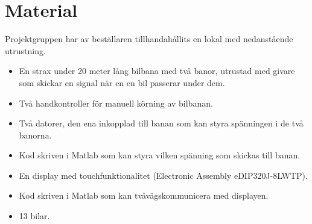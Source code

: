 \section{Material}

Projektgruppen har av beställaren tillhandahållits en lokal med nedanstående
utrustning.

\begin{itemize}
	\item En strax under 20 meter lång bilbana med två banor, utrustad med givare som
		skickar en signal när en en bil passerar under dem.
	\item Två handkontroller för manuell körning av bilbanan.
	\item Två datorer, den ena inkopplad till banan som kan styra spänningen i de
		två banorna.
	\item Kod skriven i Matlab som kan styra vilken spänning som skickas till
		banan.
	\item En display med touchfunktionalitet (Electronic Assembly eDIP320J-8LWTP).
	\item Kod skriven i Matlab som kan tvåvägskommunicera med displayen.
	\item 13 bilar.
\end{itemize}
